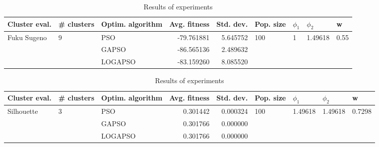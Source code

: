 \documentclass{article}
\begin{document}
\begin{table}
\centering
\caption{Results of experiments}
\begin{tabular}{lllrrllll}
\toprule
               Cluster eval. &        \# clusters & Optim. algorithm &  Avg. fitness &  Std. dev. &            Pop. size &         $\phi_{1}$ &               $\phi_{2}$ &                     w \\
\midrule
\multirow{3}{*}{Fuku Sugeno} & \multirow{3}{*}{9} &              PSO &    -79.761881 &   5.645752 & \multirow{3}{*}{100} & \multirow{3}{*}{1} & \multirow{3}{*}{1.49618} & \multirow{3}{*}{0.55} \\
                             &                    &            GAPSO &    -86.565136 &   2.489632 &                      &                    &                          &                       \\
                             &                    &          LOGAPSO &    -83.159260 &   8.085520 &                      &                    &                          &                       \\
\bottomrule
\end{tabular}
\end{table}
\begin{table}
\centering
\caption{Results of experiments}
\begin{tabular}{lllrrllll}
\toprule
              Cluster eval. &        \# clusters & Optim. algorithm &  Avg. fitness &  Std. dev. &            Pop. size &               $\phi_{1}$ &               $\phi_{2}$ &                       w \\
\midrule
\multirow{3}{*}{Silhouette} & \multirow{3}{*}{3} &              PSO &      0.301442 &   0.000324 & \multirow{3}{*}{100} & \multirow{3}{*}{1.49618} & \multirow{3}{*}{1.49618} & \multirow{3}{*}{0.7298} \\
                            &                    &            GAPSO &      0.301766 &   0.000000 &                      &                          &                          &                         \\
                            &                    &          LOGAPSO &      0.301766 &   0.000000 &                      &                          &                          &                         \\
\bottomrule
\end{tabular}
\end{table}
\end{document}
